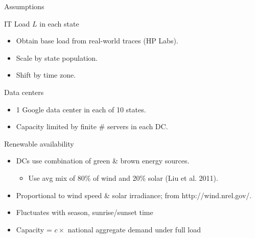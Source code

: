 \documentclass[xcolor=dvipsnames]{beamer}
\newcommand{\bi}{\begin{itemize}}
\newcommand{\ei}{\end{itemize}}
\newcommand{\itm}{\item}
\begin{document}
\begin{frame}{Assumptions}


	\begin{block}{IT Load $L$ in each state}
 	\bi
		\item 	Obtain base load from real-world traces (HP Labs).
		\item 	Scale by state population. 
		\item 	Shift by time zone.
	\ei
	\end{block}
\vspace{-3mm}
	 \begin{block}{Data centers}
			\begin{itemize}
				\item        1 Google data center in each of 10 states. %
				\item 	Capacity limited by finite \# servers in each DC.
			\end{itemize}
	\end{block}
\vspace{-3mm}
	\begin{block}{Renewable availability} 
	\bi
		\itm 	DCs use combination of green \& brown energy sources.
			\begin{itemize}
				\item  Use avg mix of 80\% of wind and 20\% solar (Liu et al. 2011). %
			\end{itemize}
		\itm  Proportional to wind speed \& solar irradiance; from http://wind.nrel.gov/.  %
		\itm Fluctuates with season, sunrise/sunset time
		\itm Capacity = $c \times$ national aggregate demand under full load
		\ei
	\end{block}
\end{frame}
\end{document}
